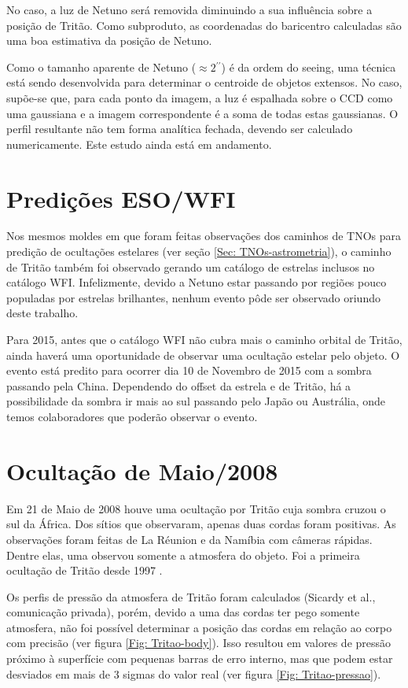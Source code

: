 \documentclass[12pt,a4paper]{monografia}
\newcommand{\arcsec}{\ensuremath{^{\prime\prime}}}%
\begin{document}
No caso, a luz de Netuno será removida diminuindo a sua influência sobre a posição de Tritão. Como subproduto, as coordenadas do baricentro calculadas são uma boa estimativa da posição de Netuno.

Como o tamanho aparente de Netuno ($\approx 2\arcsec$) é da ordem do seeing, uma técnica está sendo desenvolvida para determinar o centroide de objetos extensos. No caso, supõe-se que, para cada ponto da imagem, a luz é espalhada sobre o CCD como uma gaussiana e a imagem correspondente é a soma de todas estas gaussianas. O perfil resultante não tem forma analítica fechada, devendo ser calculado numericamente. Este estudo ainda está em andamento.


\section{Predições ESO/WFI}
\label{Sec: Netuno-predic}

\indent \indent Nos mesmos moldes em que foram feitas observações dos caminhos de TNOs para predição de ocultações estelares (ver seção \ref{Sec: TNOs-astrometria}), o caminho de Tritão também foi observado gerando um catálogo de estrelas inclusos no catálogo WFI. Infelizmente, devido a Netuno estar passando por regiões pouco populadas por estrelas brilhantes, nenhum evento pôde ser observado oriundo deste trabalho.

Para 2015, antes que o catálogo WFI não cubra mais o caminho orbital de Tritão, ainda haverá uma oportunidade de observar uma ocultação estelar pelo objeto. O evento está predito para ocorrer dia 10 de Novembro de 2015 com a sombra passando pela China. Dependendo do offset da estrela e de Tritão, há a possibilidade da sombra ir mais ao sul passando pelo Japão ou Austrália, onde temos colaboradores que poderão observar o evento.


\section{Ocultação de Maio/2008}
\label{Sec: Netuno-maio2008}

\indent \indent Em 21 de Maio de 2008 houve uma ocultação por Tritão cuja sombra cruzou o sul da África. Dos sítios que observaram, apenas duas cordas foram positivas. As observações foram feitas de La Réunion e da Namíbia com câmeras rápidas. Dentre elas, uma observou somente a atmosfera do objeto. Foi a primeira ocultação de Tritão desde 1997 \citep{Elliot2000}.

Os perfis de pressão da atmosfera de Tritão foram calculados (Sicardy et al., comunicação privada), porém, devido a uma das cordas ter pego somente atmosfera, não foi possível determinar a posição das cordas em relação ao corpo com precisão (ver figura \ref{Fig: Tritao-body}). Isso resultou em valores de pressão próximo à superfície com pequenas barras de erro interno, mas que podem estar desviados em mais de 3 sigmas do valor real (ver figura \ref{Fig: Tritao-pressao}).
\end{document}
